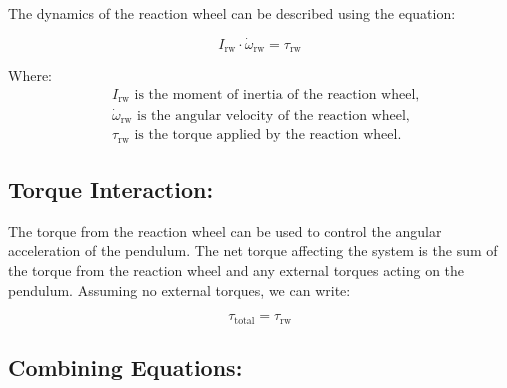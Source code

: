 \documentclass{article}
\begin{document}
\begin{multicols}{2}
The dynamics of the reaction wheel can be described using the equation:

\[
I_{\text{rw}} \cdot \dot{\omega}_{\text{rw}} = \tau_{\text{rw}}
\]

Where:
\begin{align*}
&I_{\text{rw}} \text{ is the moment of inertia of the reaction wheel,} \\
&\dot{\omega}_{\text{rw}} \text{ is the angular velocity of the reaction wheel,} \\
&\tau_{\text{rw}} \text{ is the torque applied by the reaction wheel.}
\end{align*}

\subsection{Torque Interaction:}

The torque from the reaction wheel can be used to control the angular acceleration of the pendulum. The net torque affecting the system is the sum of the torque from the reaction wheel and any external torques acting on the pendulum. Assuming no external torques, we can write:

\[
\tau_{\text{total}} = \tau_{\text{rw}}
\]

\subsection{Combining Equations:}


\end{multicols}
\end{document}
